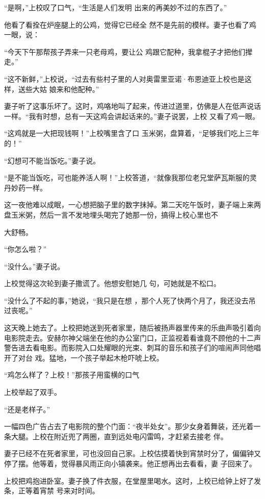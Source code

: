 \documentclass{article}
\begin{document}
“是啊，”上校叹了口气，“生活是人们发明
出来的再美妙不过的东西了。” 

他看了看拴在炉座腿上的公鸡，觉得它已经全
然不是先前的模样。妻子也看了鸡一眼，说： 

“今天下午那帮孩子弄来一只老母鸡，要让公
鸡跟它配种，我拿棍子才把他们撵走。” 

\newpage

“这不新鲜，”上校说，“过去有些村子里的人对奥雷里亚诺·布恩迪亚上校也是这样，送些大姑
娘来和他配种。” 

妻子听了这事乐坏了。这时，鸡咯地叫了起来，传进过道里，仿佛是人在低声说话一样。“我有时想，总有一天这鸡会讲起话来的。”妻子说罢，上校
又看了鸡一眼。 

“这鸡就是一大把现钱啊！”上校嘴里含了口
玉米粥，盘算着，“足够我们吃上三年的！” 


“幻想可不能当饭吃。”妻子说。 

“是不能当饭吃，可也能养活人啊！”上校答道，“就像我那位老兄堂萨瓦斯服的灵丹妙药一样。

这一夜他难以成眠，一心想把脑子里的数字抹掉。第二天吃午饭时，妻子端上来两盘玉米粥，然后一言不发地埋头喝完了她那一份，搞得上校心里也不

\newpage
大舒畅。 


“你怎么啦？” 


“没什么。”妻子说。 

上校觉得这次轮到妻子撒谎了。他想安慰她几
句，可她就是不松口。 

“没什么了不起的事，”她说，“我只是在想
，那个人死了快两个月了，我还没去吊过丧呢。” 

这天晚上她去了。上校把她送到死者家里，随后被扬声器里传来的乐曲声吸引着向电影院走去。安赫尔神父端坐在他的办公室门口，正监视着看谁竟不顾他的十二声警告进去看电影。而影院入口处耀眼的光束、刺耳的音乐和孩子们的喧闹声同他唱开了对台
戏。猛地，一个孩子举起木枪吓唬上校。 

“鸡怎么样了？上校！”那孩子用蛮横的口气


\newpage

上校举起了双手。 


“还是老样子。” 

一幅四色广告占去了电影院的整个门面：“夜半处女”。那少女身着舞装，还光着一条大腿。上校在附近兜了两圈，直到远处电闪雷鸣，才赶紧去接老
伴。 

妻子已经不在死者家里，可也没回自己家。上校估摸着快到宵禁时分了，偏偏钟又停了摆。他等着，觉得暴风雨正向小镇袭来。他正想再出去看看，妻
子回来了。 

上校把鸡抱进卧室。妻子换了件衣服，在堂屋里喝水。这时，上校已给钟上好了发条，正等着宵禁
号来对时间。 
\end{document}
